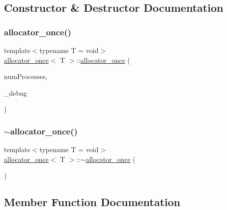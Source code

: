 \subsection{Constructor \& Destructor Documentation}
\mbox{\label{classallocator__once_ac67f48c32b2da6477d56ff602b8aeb0a}} 
\subsubsection{\texorpdfstring{allocator\+\_\+once()}{allocator\_once()}}
{\footnotesize\ttfamily template$<$typename T  = void$>$ \\
\hyperlink{classallocator__once}{allocator\+\_\+once}$<$ T $>$\+::\hyperlink{classallocator__once}{allocator\+\_\+once} (\begin{DoxyParamCaption}\item[{const int}]{num\+Processes,  }\item[{\hyperlink{classdebugInfo}{debug\+Info} $\ast$const}]{\+\_\+debug }\end{DoxyParamCaption})\hspace{0.3cm}{\ttfamily [inline]}}

\mbox{\label{classallocator__once_a61d85b93659618b4777498ba7e20c872}} 
\subsubsection{\texorpdfstring{$\sim$allocator\+\_\+once()}{~allocator\_once()}}
{\footnotesize\ttfamily template$<$typename T  = void$>$ \\
\hyperlink{classallocator__once}{allocator\+\_\+once}$<$ T $>$\+::$\sim$\hyperlink{classallocator__once}{allocator\+\_\+once} (\begin{DoxyParamCaption}{ }\end{DoxyParamCaption})\hspace{0.3cm}{\ttfamily [inline]}}



\subsection{Member Function Documentation}
\mbox{\label{classallocator__once_abfd2798c921320154252d3c16f67e434}} 
